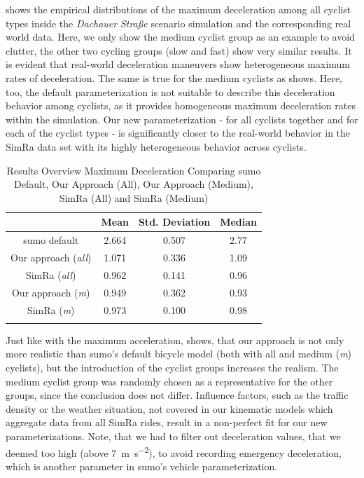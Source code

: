  shows the empirical distributions of the maximum deceleration among all cyclist types inside the \textit{Dachauer} \textit{Straße} scenario simulation and the corresponding real world data.
Here, we only show the medium cyclist group as an example to avoid clutter, the other two cycling groups (slow and fast) show very similar results.
It is evident that real-world deceleration maneuvers show heterogeneous maximum rates of deceleration.
The same is true for the medium cyclists as  shows.
Here, too, the default parameterization is not suitable to describe this deceleration behavior among cyclists, as it provides homogeneous maximum deceleration rates within the simulation.
Our new parameterization - for all cyclists together and for each of the cyclist types - is significantly closer to the real-world behavior in the SimRa data set with its highly heterogeneous behavior across cyclists.
\begin{table}
\centering
\caption{Results Overview Maximum Deceleration Comparing \ac{sumo} Default, Our Approach (All), Our Approach (Medium), SimRa (All) and SimRa (Medium)}%
\label{tab:results_overview_dec}
\begin{tabular}{cccc}
\toprule
& Mean & Std. Deviation & Median\\
\midrule
\midrule
\ac{sumo} default & \num{2.664} & \num{0.507} & \num{2.77} \\
\midrule
Our approach (\textit{all}) & \num{1.071} & \num{0.336} & \num{1.09} \\
SimRa (\textit{all}) & \num{0.962} & \num{0.141} & \num{0.96} \\
\midrule
Our approach (\textit{m}) & \num{0.949} & \num{0.362} & \num{0.93} \\
SimRa (\textit{m}) & \num{0.973} & \num{0.100} & \num{0.98} \\
\bottomrule&
\end{tabular}
\end{table}
Just like with the maximum acceleration,  shows, that our approach is not only more realistic than \ac{sumo}'s default bicycle model (both with all and medium (\textit{m}) cyclists), but the introduction of the cyclist groups increases the realism.
The medium cyclist group was randomly chosen as a representative for the other groups, since the conclusion does not differ.
Influence factors, such as the traffic density or the weather situation, not covered in our kinematic models which aggregate data from all SimRa rides, result in a non-perfect fit for our new parameterizations.
Note, that we had to filter out deceleration values, that we deemed too high (above \SI{7}{\m\per\s\squared}), to avoid recording emergency deceleration, which is another parameter in \ac{sumo}'s vehicle parameterization.


